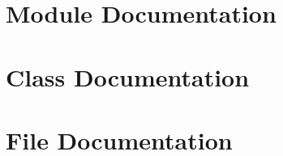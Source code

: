 \documentclass[a4paper,fontsize=10pt,twoside,DIV15,BCOR12mm,headinclude=true,footinclude=false,pagesize,bibtotoc]{scrbook}
\begin{document}
\section{Module Documentation}




\section{Class Documentation}



\section{File Documentation}







\end{document}
